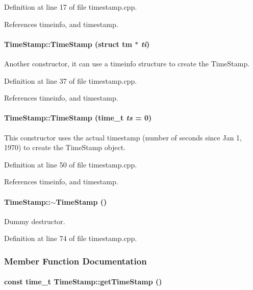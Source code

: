 Definition at line 17 of file timestamp.cpp.

References timeinfo, and timestamp.\hypertarget{classTimeStamp_TimeStampa2}{
\paragraph[TimeStamp]{\setlength{\rightskip}{0pt plus 5cm}Time\-Stamp::Time\-Stamp (struct tm $\ast$ {\em ti})}\hfill}
\label{classTimeStamp_TimeStampa2}


Another constructor, it can use a timeinfo structure to create the Time\-Stamp. 

Definition at line 37 of file timestamp.cpp.

References timeinfo, and timestamp.\hypertarget{classTimeStamp_TimeStampa3}{
\paragraph[TimeStamp]{\setlength{\rightskip}{0pt plus 5cm}Time\-Stamp::Time\-Stamp (time\_\-t {\em ts} = 0)}\hfill}
\label{classTimeStamp_TimeStampa3}


This constructor uses the actual timestamp (number of seconds since Jan 1, 1970) to create the Time\-Stamp object. 

Definition at line 50 of file timestamp.cpp.

References timeinfo, and timestamp.\hypertarget{classTimeStamp_TimeStampa4}{
\paragraph[$\sim$TimeStamp]{\setlength{\rightskip}{0pt plus 5cm}Time\-Stamp::$\sim$Time\-Stamp ()}\hfill}
\label{classTimeStamp_TimeStampa4}


Dummy destructor. 

Definition at line 74 of file timestamp.cpp.

\subsubsection{Member Function Documentation}
\hypertarget{classTimeStamp_TimeStampa14}{
\paragraph[getTimeStamp]{\setlength{\rightskip}{0pt plus 5cm}const time\_\-t Time\-Stamp::get\-Time\-Stamp ()}\hfill}
\label{classTimeStamp_TimeStampa14}


